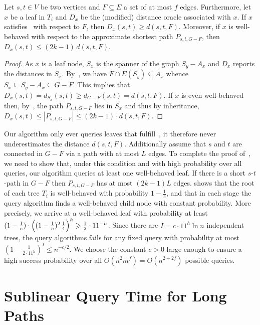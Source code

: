 \documentclass{article}\usepackage[a4paper,margin=20mm]{geometry}
\newcommand*{\nwspace}{\hspace*{.1em}}
\renewcommand{\le}{\leqslant}
\renewcommand{\ge}{\geqslant}
\begin{document}
\begin{lemma}
\label{lem:approx_well-behaved_child}
  Let $s,t \in V$ be two vertices and $F \subseteq E$ a set of at most $f$ edges.
  Furthermore, let $x$ be a leaf in $T_i$ and $D_x$ be the (modified) distance oracle associated with $x$.
  If $x$ satisfies~ with respect to $F$, then $D_x(s,t) \ge d(s,t,F)$.
  Moreover, if $x$ is well-behaved with respect to the approximate shortest path $P_{s,t,G-F}$,
  then $D_x(s,t) \le (2k{-}1) \, d(s,t,F)$.
\end{lemma}

\begin{proof}
As $x$ is a leaf node, $S_x$ is the spanner of the graph $S_y-A_x$
and $D_x$ reports the distances in $S_x$.
By~, we have $F\cap E(S_y)\subseteq A_x$ 
whence $S_x \subseteq S_y-A_x \subseteq G-F$.
This implies that~$D_x(s,t) = d_{S_x}(s,t) \ge d_{G-F}(s,t) = d(s,t,F)$.
If $x$ is even well-behaved then, by~, the path $P_{s,t,G-F}$ lies in $S_x$
and thus by inheritance, $D_x(s,t) \le |P_{s,t,G-F}| \le (2k{-}1) \cdot d(s,t,F)$.
\end{proof}

Our algorithm only ever queries leaves that fulfill~,
it therefore never underestimates the distance $d(s,t,F)$.
Additionally assume that $s$ and $t$ are connected in $G{-}F$ via a path with at most $L$ edges.
To complete the proof of~,
we need to show that, under this condition and with high probability over all queries,
our algorithm queries at least one well-behaved leaf.
If there is a short $s$-$t$-path in $G{-}F$ then $P_{s,t,G-F}$ has at most $(2k{-}1)L$ edges.
 shows that the root of each tree $T_i$
is well-behaved with probability $1-\frac{1}{e}$, 
and that in each stage the query algorithm finds a well-behaved child node with constant probability.
More precisely, we arrive at a well-behaved leaf with probability at least
$(1-\tfrac{1}{e}) \cdot \Big( (1-\tfrac{1}{e})^2 \nwspace \tfrac{1}{4} \Big)^h
  \ge \tfrac{1}{2} \cdot 11^{-h}$.
Since there are $I = c \cdot 11^h \ln n$ independent trees,
the query algorithms fails for any fixed query with probability at most 
$(1-\frac{1}{2 \cdot 11^h})^I \le n^{-c/2}$.
We choose the constant $c > 0$ large enough to ensure a high success probability over all 
$O(n^2 m^f) = O(n^{2+2f})$ possible queries.


\section{Sublinear Query Time for Long Paths}
\label{sec:sublinear_query_time}
\end{document}
